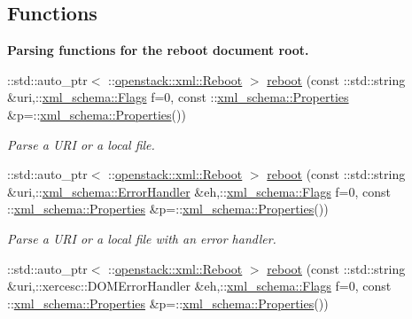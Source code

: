 \subsection*{Functions}
\begin{Indent}{\bf Parsing functions for the reboot document root.}\par
\begin{DoxyCompactItemize}
\item 
::std::auto\_\-ptr$<$ ::\hyperlink{classopenstack_1_1xml_1_1Reboot}{openstack::xml::Reboot} $>$ \hyperlink{namespaceopenstack_1_1xml_a70a85a34229eb44b76dac69b46031708}{reboot} (const ::std::string \&uri,::\hyperlink{namespacexml__schema_affb4c227cbd9aa7453dd1dc5a1401943}{xml\_\-schema::Flags} f=0, const ::\hyperlink{namespacexml__schema_ad27ce19a7ee1d3b1064092648898f64c}{xml\_\-schema::Properties} \&p=::\hyperlink{namespacexml__schema_ad27ce19a7ee1d3b1064092648898f64c}{xml\_\-schema::Properties}())
\begin{DoxyCompactList}\small\item\em Parse a URI or a local file. \item\end{DoxyCompactList}\item 
::std::auto\_\-ptr$<$ ::\hyperlink{classopenstack_1_1xml_1_1Reboot}{openstack::xml::Reboot} $>$ \hyperlink{namespaceopenstack_1_1xml_aa2d530e87c505c7cb5608172dd2025b5}{reboot} (const ::std::string \&uri,::\hyperlink{namespacexml__schema_ab1c9361bfd3b404eaabf0c31eded79dc}{xml\_\-schema::ErrorHandler} \&eh,::\hyperlink{namespacexml__schema_affb4c227cbd9aa7453dd1dc5a1401943}{xml\_\-schema::Flags} f=0, const ::\hyperlink{namespacexml__schema_ad27ce19a7ee1d3b1064092648898f64c}{xml\_\-schema::Properties} \&p=::\hyperlink{namespacexml__schema_ad27ce19a7ee1d3b1064092648898f64c}{xml\_\-schema::Properties}())
\begin{DoxyCompactList}\small\item\em Parse a URI or a local file with an error handler. \item\end{DoxyCompactList}\item 
::std::auto\_\-ptr$<$ ::\hyperlink{classopenstack_1_1xml_1_1Reboot}{openstack::xml::Reboot} $>$ \hyperlink{namespaceopenstack_1_1xml_a19750408764f43b123abff3d5d377d5b}{reboot} (const ::std::string \&uri,::xercesc::DOMErrorHandler \&eh,::\hyperlink{namespacexml__schema_affb4c227cbd9aa7453dd1dc5a1401943}{xml\_\-schema::Flags} f=0, const ::\hyperlink{namespacexml__schema_ad27ce19a7ee1d3b1064092648898f64c}{xml\_\-schema::Properties} \&p=::\hyperlink{namespacexml__schema_ad27ce19a7ee1d3b1064092648898f64c}{xml\_\-schema::Properties}())

\end{DoxyCompactItemize}
\end{Indent}
